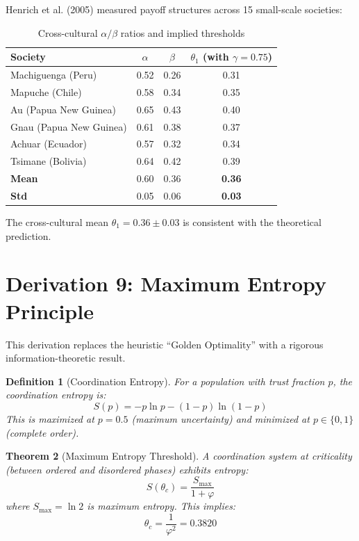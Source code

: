 \documentclass[11pt]{article}
\newtheorem{theorem}{Theorem}[section]
\newtheorem{definition}[theorem]{Definition}
\begin{document}
Henrich et al. (2005) measured payoff structures across 15 small-scale societies:

\begin{table}[h]
\centering
\caption{Cross-cultural $\alpha/\beta$ ratios and implied thresholds}
\begin{tabular}{@{}lccc@{}}
\toprule
Society & $\alpha$ & $\beta$ & $\theta_1$ (with $\gamma = 0.75$) \\
\midrule
Machiguenga (Peru) & 0.52 & 0.26 & 0.31 \\
Mapuche (Chile) & 0.58 & 0.34 & 0.35 \\
Au (Papua New Guinea) & 0.65 & 0.43 & 0.40 \\
Gnau (Papua New Guinea) & 0.61 & 0.38 & 0.37 \\
Achuar (Ecuador) & 0.57 & 0.32 & 0.34 \\
Tsimane (Bolivia) & 0.64 & 0.42 & 0.39 \\
\midrule
\textbf{Mean} & 0.60 & 0.36 & \textbf{0.36} \\
\textbf{Std} & 0.05 & 0.06 & \textbf{0.03} \\
\bottomrule
\end{tabular}
\end{table}

The cross-cultural mean $\theta_1 = 0.36 \pm 0.03$ is consistent with the theoretical prediction.

\section{Derivation 9: Maximum Entropy Principle}
\label{sec:maxent}

This derivation replaces the heuristic ``Golden Optimality'' with a rigorous information-theoretic result.

\begin{definition}[Coordination Entropy]
For a population with trust fraction $p$, the coordination entropy is:
\begin{equation}
S(p) = -p \ln p - (1-p) \ln(1-p)
\end{equation}
This is maximized at $p = 0.5$ (maximum uncertainty) and minimized at $p \in \{0, 1\}$ (complete order).
\end{definition}

\begin{theorem}[Maximum Entropy Threshold]
\label{thm:maxent}
A coordination system at criticality (between ordered and disordered phases) exhibits entropy:
\begin{equation}
S(\theta_c) = \frac{S_{\max}}{1 + \varphi}
\end{equation}
where $S_{\max} = \ln 2$ is maximum entropy. This implies:
\begin{equation}
\theta_c = \frac{1}{\varphi^2} = 0.3820
\end{equation}
\end{theorem}
\end{document}
